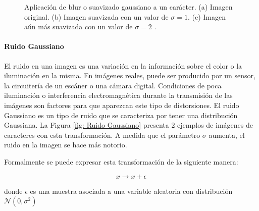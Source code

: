 		\begin{figure}[htbp]
			\centering
			\caption[Suavizado Gaussiano de un carácter]{Aplicación de blur o suavizado gaussiano a un carácter. (a) I\-ma\-gen original. (b) Imagen suavizada con un valor de $\sigma = 1$.  (c) Imagen aún más suavizada con un valor de $\sigma = 2$ .}
			\label{fig: Suavizado Gaussiano}
		\end{figure}				
			
			
		\paragraph{Ruido Gaussiano}			
			
			El ruido en una imagen es una variación en la información sobre el color o la iluminación en la misma. En imágenes reales, puede ser producido por un sensor, la circuitería de un escáner o una cámara digital. Condiciones de poca iluminación o interferencia electromagnética durante la transmisión de las imágenes son factores para que aparezcan este tipo de distorsiones. El ruido Gaussiano es un tipo de ruido que se caracteriza por tener una distribución Gaussiana. La Figura \ref{fig: Ruido Gaussiano} presenta 2 ejemplos de imágenes de caracteres con esta transformación. A medida que el parámetro $\sigma$  aumenta, el ruido en la imagen se hace más notorio.
			
			Formalmente se puede expresar esta transformación de la siguiente manera:
			
			$$x \rightarrow x + \epsilon $$
			
			donde $\epsilon$ es una muestra asociada a una variable aleatoria con distribución $\mathcal{N}(0, \sigma^2)$
			
